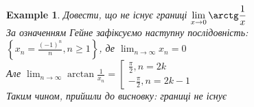 \documentclass[a4paper, 14pt]{extarticle}
\def\huge{\displaystyle}
\theoremstyle{theoremdd}
\theoremstyle{theoremdd}
\theoremstyle{theoremdd}
\theoremstyle{theoremdd}
\newtheorem{example}[theorem]{Example}
\theoremstyle{theoremdd}
\theoremstyle{theoremdd}
\theoremstyle{theoremdd}
\theoremstyle{theoremdd}
\begin{document}
\begin{example}
	Довести, що не існує границі $\huge \lim_{x \to 0} \arctg \frac{1}{x}$\\
	За означенням Гейне зафіксуємо наступну послідовність:\\
	$\huge \left\{x_n = \frac{(-1)^n}{n}, n \geq 1\right\}$, де $\huge \lim_{n \to \infty} x_n = 0$\\
	Але $\huge \lim_{n \to \infty} \arctan \frac{1}{x_n} = \left[ \begin{gathered} \frac{\pi}{2}, n = 2k \\ -\frac{\pi}{2}, n = 2k-1 \end{gathered} \right.$\\
	Таким чином, прийшли до висновку: границі не існує
\end{example}
	
\end{document}
